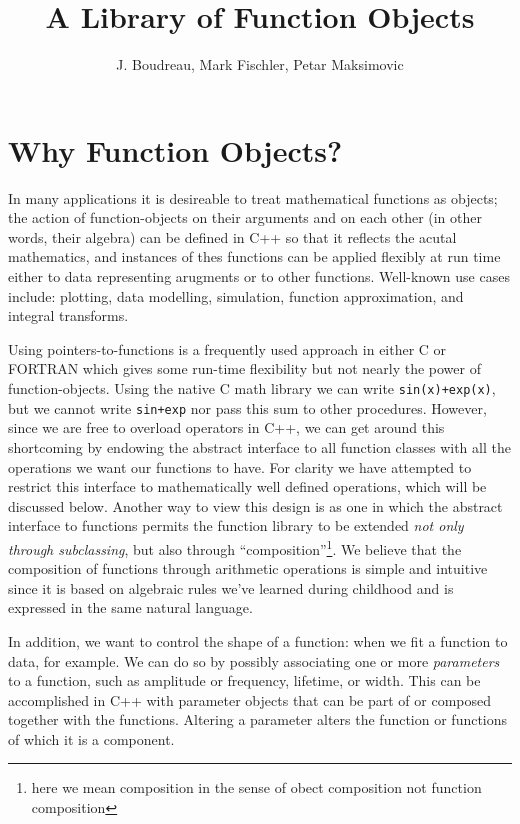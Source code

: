 \documentclass{report}
\begin{document}
\title{A Library of Function Objects}
\author{J. Boudreau, Mark Fischler, Petar Maksimovic}
\maketitle

\section{Why Function Objects?}

\noindent In many applications it is desireable to treat mathematical functions
as objects; the action of function-objects on their arguments and on
each other (in other words, their algebra) can be defined in C++ so
that it reflects the acutal mathematics, and instances of thes
functions can be applied flexibly at run time either to data
representing arugments or to other functions.  Well-known use cases
include: plotting, data modelling, simulation, function approximation,
and integral transforms.

\noindent Using pointers-to-functions is a frequently used approach in either C or
FORTRAN which gives some run-time flexibility but not nearly the power of
function-objects.  Using the native C math library we can write 
\verb#sin(x)+exp(x)#,  but we cannot write \verb#sin+exp# nor pass this 
sum to other procedures.  However, since we are free to overload operators
in C++, we can get around this shortcoming by endowing the abstract interface
to all function classes with all the operations we want our functions to
have.  For clarity we have attempted to restrict this interface to 
mathematically well defined operations, which will be discussed below.  Another
way to view this design is as one in which the abstract interface to functions
permits the function library to be extended {\it not only through subclassing},
but also through ``composition''\footnote{here we mean composition in the
sense of obect composition not function composition}. We believe that the 
composition of functions through arithmetic operations is simple and
intuitive since it is based on algebraic rules we've learned during childhood
and is expressed in the same natural language.

\noindent In addition, we want to control the shape of a function: when we fit a 
function to data, for example.  We can do so by possibly associating one or 
more {\it parameters} to a function, such as amplitude or frequency, lifetime,
or width.  This can be accomplished in C++ with parameter objects that can
be part of or composed together with the functions.  Altering a parameter 
alters the function or functions of which it is a component.
\end{document}
